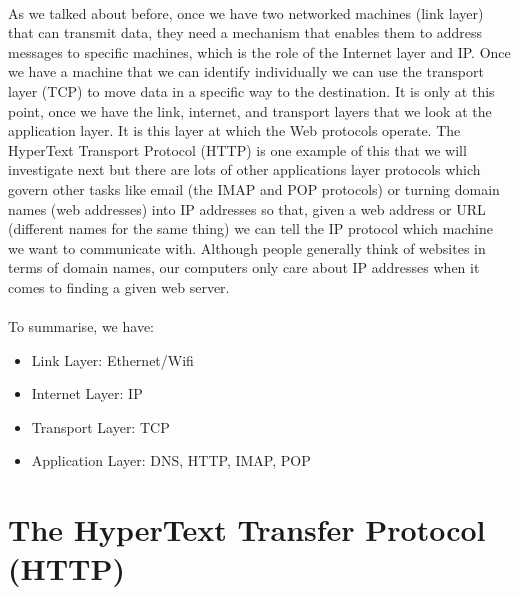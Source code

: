 \paragraph{} As we talked about before, once we have two networked machines (link layer) that can transmit data, they need a mechanism that enables them to address messages to specific machines, which is the role of the Internet layer and IP. Once we have a machine that we can identify individually we can use the transport layer (TCP) to move data in a specific way to the destination. It is only at this point, once we have the link, internet, and transport layers that we look at the application layer. It is this layer at which the Web protocols operate. The HyperText Transport Protocol (HTTP) is one example of this that we will investigate next but there are lots of other applications layer protocols which govern other tasks like email (the IMAP and POP protocols) or turning domain names (web addresses) into IP addresses so that, given a web address or URL (different names for the same thing) we can tell the IP protocol which machine we want to communicate with. Although people generally think of websites in terms of domain names, our computers only care about IP addresses when it comes to finding a given web server.
\paragraph{} To summarise, we have:
\begin{itemize}
\item Link Layer: Ethernet/Wifi
\item Internet Layer: IP
\item Transport Layer: TCP
\item Application Layer: DNS, HTTP, IMAP, POP 
\end{itemize}


\section{The HyperText Transfer Protocol (HTTP)}
